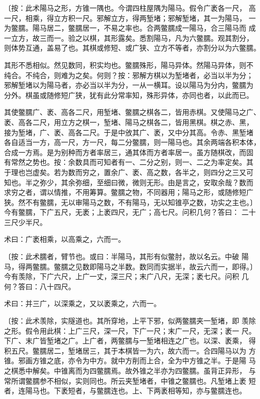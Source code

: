 \documentclass[12pt,UTF8]{ctexbook}
\begin{document}
〔按：此术陽马之形，方锥一隅也。今谓四柱屋隅为陽马。假令广袤各一尺， 高一尺，相乘，得立方积一尺。邪解立方，得两堑堵；邪解堑堵，其一为陽马， 一为鳖臑。陽马居二，鳖臑居一，不易之率也。合两鳖臑成一陽马，合三陽马而 成一立方，故三而一。验之以棋，其形露矣。悉割陽马，凡为六鳖臑。观其割分， 则体势互通，盖易了也。其棋或修短、或广狭、立方不等者，亦割分以为六鳖臑。

其形不悉相似。然见数同，积实均也。鳖臑殊形，陽马异体。然陽马异体，则不 纯合。不纯合，则难为之矣。何则？按：邪解方棋以为堑堵者，必当以半为分； 邪解堑堵以为陽马者，亦必当以半为分，一从一横耳。设以陽马为分内，鳖臑为 分外。棋虽或随修短广狭，犹有此分常率知，殊形异体，亦同也者，以此而已。

其使鳖臑广、袤、高各二尺，用堑堵、鳖臑之棋各二，皆用赤棋。又使陽马之广、 袤、高各二尺，用立方之棋一，堑堵、陽马之棋各二，皆用黑棋。棋之赤、黑， 接为堑堵，广、袤、高各二尺。于是中攽其广、袤，又中分其高。令赤、黑堑堵 各自适当一方，高一尺，方一尺，每二分鳖臑，则一陽马也。其余两端各积本体， 合成一方焉。是为别种而方者率居三，通其体而方者率居一。虽方随棋改，而固 有常然之势也。按：余数具而可知者有一、二分之别，则一、二之为率定矣。其 于理也岂虚矣。若为数而穷之，置余广、袤、高之数，各半之，则四分之三又可 知也。半之弥少，其余弥细，至细曰微，微则无形。由是言之，安取余哉？数而 求穷之者，谓以情推，不用筹算。鳖臑之物，不同器用；陽马之形，或随修短广 狭。然不有鳖臑，无以审陽马之数，不有陽马，无以知锥亭之数，功实之主也。〕 今有鳖臑，下广五尺，无袤；上袤四尺，无广；高七尺。问积几何？答曰： 二十三尺少半尺。

术曰：广袤相乘，以高乘之，六而一。

〔按：此术臑者，臂节也。或曰：半陽马，其形有似鳖肘，故以名云。中破 陽马，得两鳖臑。鳖臑之见数即陽马之半数。数同而实据半，故云六而一，即得。〕 今有羡除，下广六尺，上广一丈，深三尺；末广八尺，无深；袤七尺。问积 几何？答曰：八十四尺。

术曰：并三广，以深乘之，又以袤乘之，六而一。

〔按：此术羡除，实隧道也。其所穿地，上平下邪，似两鳖臑夹一堑堵，即 羡除之形。假令用此棋：上广三尺，深一尺，下广一尺；末广一尺，无深；袤一 尺。下广、末广皆堑堵之广。上广者，两鳖臑与一堑堵相连之广也。以深、袤乘， 得积五尺。鳖臑居二，堑堵居三，其于本棋皆一为六，故六而一。合四陽马以为 方锥。邪画方锥之底，亦令为中方。就中方削而上合，全为中方锥之半。于是陽 马之棋悉中解矣。中锥离而为四鳖臑焉。故外锥之半亦为四鳖臑。虽背正异形， 与常所谓鳖臑参不相似，实则同也。所云夹堑堵者，中锥之鳖臑也。凡堑堵上袤 短者，连陽马也。下袤短者，与鳖臑连也。上、下两袤相等知，亦与鳖臑连也。
\end{document}
